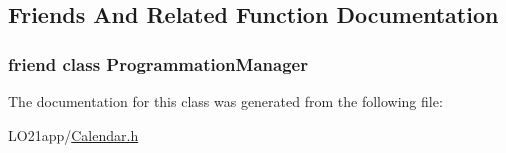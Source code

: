 \subsection{Friends And Related Function Documentation}
\hypertarget{class_programmation_manager_1_1_iterator_ade7bfcbf8cec66b12064c8ff25993d73}{}
\subsubsection[{Programmation\+Manager}]{\setlength{\rightskip}{0pt plus 5cm}friend class {\bf Programmation\+Manager}\hspace{0.3cm}{\ttfamily [friend]}}\label{class_programmation_manager_1_1_iterator_ade7bfcbf8cec66b12064c8ff25993d73}


The documentation for this class was generated from the following file\+:\begin{DoxyCompactItemize}
\item 
L\+O21app/\hyperlink{_calendar_8h}{Calendar.\+h}\end{DoxyCompactItemize}
